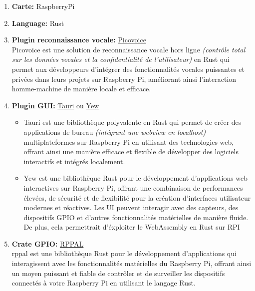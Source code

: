 \begin{enumerate}
    \item \textbf{Carte:} RaspberryPi 
    \item \textbf{Language:} Rust 
    \item \textbf{Plugin reconnaissance vocale:} \href{https://picovoice.ai/}{Picovoice} \\
            Picovoice est une solution de reconnaissance vocale hors ligne \textit{(contrôle total sur les données vocales et la confidentialité de l'utilisateur)} en Rust qui permet aux développeurs d'intégrer 
            des fonctionnalités vocales puissantes et privées dans leurs projets sur Raspberry Pi, améliorant ainsi l'interaction homme-machine de manière locale et efficace. 

    \item \textbf{Plugin GUI:} \href{https://tauri.app/}{Tauri} ou \href{https://yew.rs/}{Yew}

        \begin{itemize}
            \item Tauri est une bibliothèque polyvalente en Rust qui permet de créer des applications de bureau \textit{(intégrant une webview en localhost)}
            multiplateformes sur Raspberry Pi en utilisant des technologies web, offrant ainsi une manière efficace et flexible de développer des logiciels interactifs et intégrés localement.

            \item  Yew est une bibliothèque Rust pour le développement d'applications web interactives sur Raspberry Pi, 
            offrant une combinaison de performances élevées, de sécurité et de flexibilité pour la création d'interfaces utilisateur modernes et réactives. Les UI peuvent interagir avec des capteurs, des dispositifs GPIO et d'autres fonctionnalités matérielles de manière fluide.
            De plus, cela permettrait d'éxploiter le WebAssembly en Rust sur RPI 
        \end{itemize}


    \item \textbf{Crate GPIO:} \href{https://github.com/golemparts/rppal}{RPPAL} \\
    rppal est une bibliothèque Rust pour le développement d'applications qui interagissent avec les fonctionnalités matérielles du Raspberry Pi, offrant ainsi 
    un moyen puissant et fiable de contrôler et de surveiller les dispositifs connectés à votre Raspberry Pi en utilisant le langage Rust.
\end{enumerate}

